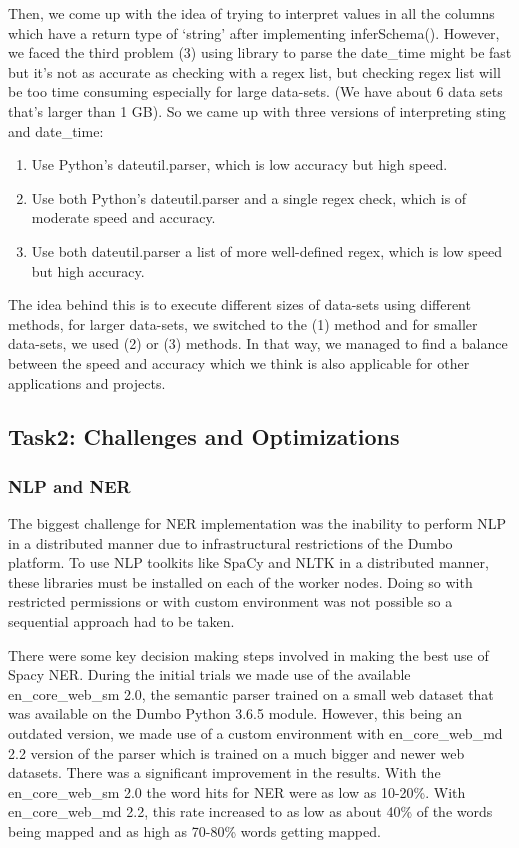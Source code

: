 \documentclass[sigconf,authordraft]{acmart}
\begin{document}
Then, we come up with the idea of trying to interpret values in all the columns which have a return type of ‘string’ after implementing inferSchema(). However, we faced the third problem (3) using library to parse the date\_time might be fast but it’s not as accurate as checking with a regex list, but checking regex list will be too time consuming especially for large data-sets. (We have about 6 data sets that’s larger than 1 GB). So we came up with three versions of interpreting sting and date\_time:
\begin{enumerate}
    \item Use Python’s dateutil.parser, which is low accuracy but high speed.
    \item Use both Python’s dateutil.parser and a single regex check, which is of moderate speed and accuracy.
    \item Use both dateutil.parser a list of more well-defined regex, which is low speed but high accuracy.
\end{enumerate}

The idea behind this is to execute different sizes of data-sets using different methods, for larger data-sets, we switched to the (1) method and for smaller data-sets, we used (2) or (3) methods. In that way, we managed to find a balance between the speed and accuracy which we think is also applicable for other applications and projects.  


\subsection{Task2: Challenges and Optimizations}
\subsubsection{NLP and NER}
The biggest challenge for NER implementation was the inability to perform NLP in a distributed manner due to infrastructural restrictions of the Dumbo platform. To use NLP toolkits like SpaCy and NLTK in a distributed manner, these libraries must be installed on each of the worker nodes. Doing so with restricted permissions or with custom environment was not possible so a sequential approach had to be taken.

There were some key decision making steps involved in making the best use of Spacy NER. During the initial trials we made use of the available en\_core\_web\_sm 2.0, the semantic parser trained on a small web dataset that was available on the Dumbo Python 3.6.5 module. However, this being an outdated version, we made use of a custom  environment with en\_core\_web\_md 2.2 version of the parser which is trained on a much bigger and newer web datasets. There was a significant improvement in the results. With the en\_core\_web\_sm 2.0 the word hits for NER were as low as 10-20\%. With en\_core\_web\_md 2.2, this rate increased to as low as about 40\% of the words being mapped and as high as 70-80\% words getting mapped.
\end{document}
